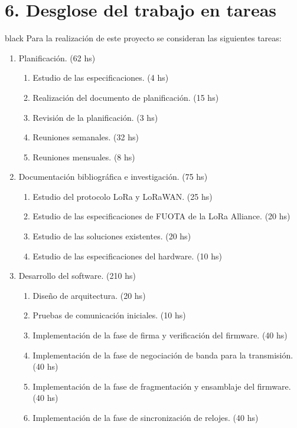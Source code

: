\documentclass[11pt]{charter}
\begin{document}
\section{6. Desglose del trabajo en tareas}
\label{sec:wbs}

\begin{consigna}{black}
Para la realización de este proyecto se consideran las siguientes tareas:

\begin{enumerate}
	\item Planificación. \hfill(62 hs)
	\begin{enumerate}
		\item Estudio de las especificaciones. \hfill(4 hs)
		\item Realización del documento de planificación. \hfill(15 hs)
		\item Revisión de la planificación. \hfill(3 hs)
		\item Reuniones semanales. \hfill(32 hs)
		\item Reuniones mensuales. \hfill(8 hs)
	\end{enumerate}
	\item Documentación bibliográfica e investigación. (75 hs)
	\begin{enumerate}
		\item Estudio del protocolo LoRa y LoRaWAN. \hfill(25 hs)
		\item Estudio de las especificaciones de FUOTA de la LoRa Alliance\textregistered. \hfill(20 hs)
		\item Estudio de las soluciones existentes. \hfill(20 hs)
		\item Estudio de las especificaciones del hardware. \hfill(10 hs)
	\end{enumerate}
	\item Desarrollo del software. \hfill(210 hs)
	\begin{enumerate}
		\item Diseño de arquitectura. \hfill(20 hs)
		\item Pruebas de comunicación iniciales. \hfill(10 hs)
		\item Implementación de la fase de firma y verificación del firmware. \hfill(40 hs)
		\item Implementación de la fase de negociación de banda para la transmisión. \hfill(40 hs)
		\item Implementación de la fase de fragmentación y ensamblaje del firmware. \hfill(40 hs)
		\item Implementación de la fase de sincronización de relojes. \hfill(40 hs)

\end{enumerate}
\end{enumerate}
\end{consigna}
\end{document}

